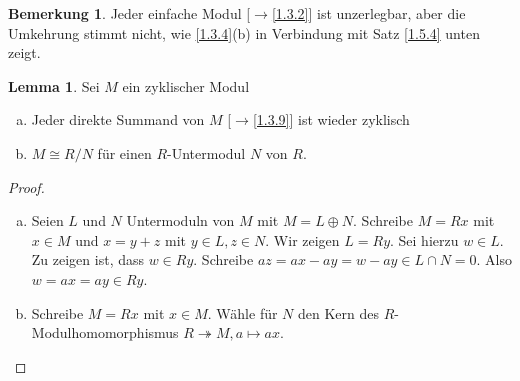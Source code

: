 \documentclass[
twoside=semi,
fontsize=12,
DIV=12, 
cleardoublepage=current,
leqno,
headings=optiontoheadandtoc, 
toc=idx
]{scrbook}
\theoremstyle{definition}
\newtheorem{bemerkung}[definition]{Bemerkung}
\newtheorem{lemma}[definition]{Lemma}
\begin{document}
	\begin{bemerkung}\label{1.5.2}
		Jeder einfache Modul [$\rightarrow$\ref{1.3.2}] ist unzerlegbar, aber die Umkehrung stimmt nicht, wie \ref{1.3.4}(b) in Verbindung mit Satz \ref{1.5.4} unten zeigt.
	\end{bemerkung}

	\begin{lemma}\label{1.5.3}
		Sei $M$ ein zyklischer Modul
		\begin{enumerate}[(a)]
			\item Jeder direkte Summand von $M$ [$\rightarrow$\ref{1.3.9}] ist wieder zyklisch
			\item $M\cong R/N$ f\"ur einen $R$-Untermodul $N$ von $R$.
		\end{enumerate}
	
		\begin{proof}
			\begin{enumerate}[(a)]
				\item Seien $L$ und $N$ Untermoduln von $M$ mit $M = L \oplus N$. Schreibe $M=Rx$ mit $x \in M$ und $x = y+z$ mit $y\in L, z \in N$.
				Wir zeigen $L = Ry$. Sei hierzu $w \in L$. Zu zeigen ist, dass $w \in Ry$. Schreibe $az = ax -ay = w - ay \in L \cap N = 0$. Also $w = ax = ay \in Ry$. 
				
				\item Schreibe $M=Rx$ mit $x \in M$. W\"ahle f\"ur $N$ den Kern des $R$-Modulhomomorphismus $R\twoheadrightarrow M, a \mapsto ax$.
			\end{enumerate}
		\end{proof}
	\end{lemma}
\end{document}
